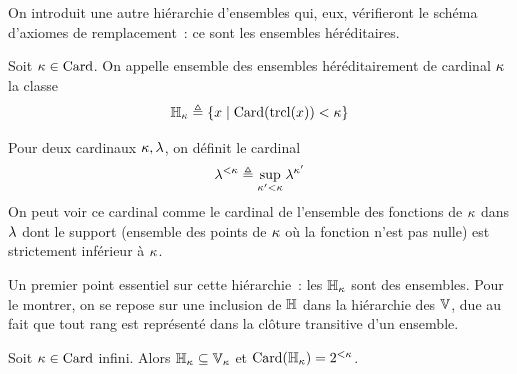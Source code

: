 On introduit une autre hiérarchie d'ensembles qui, eux, vérifieront le schéma
d'axiomes de remplacement~: ce sont les ensembles héréditaires.

\begin{definition}
  Soit $\kappa \in \operatorname{Card}$. On appelle ensemble des ensembles héréditairement de
  cardinal $\kappa$ la classe
  \[\mathbb H_\kappa \triangleq \left\{ x \;\middle\vert\; \operatorname{Card}(\operatorname{trcl}(x)) < \kappa \right\}\]
  \index[notation]{$\bH$}
\end{definition}

Pour deux cardinaux $\kappa,\lambda$, on définit le cardinal
\[\lambda^{<\kappa} \triangleq \sup_{\kappa' < \kappa} \lambda^{\kappa'}\]
On peut voir ce cardinal comme le cardinal de l'ensemble des fonctions de
$\kappa$ dans $\lambda$ dont le support (ensemble des points de $\kappa$ où la
fonction n'est pas nulle) est strictement inférieur à $\kappa$.

Un premier point essentiel sur cette hiérarchie~: les $\mathbb H_\kappa$ sont des
ensembles. Pour le montrer, on se repose sur une inclusion de $\bH$ dans la
hiérarchie des $\mathbb V$, due au fait que tout rang est représenté dans la clôture
transitive d'un ensemble.

\begin{proposition}\label{prop.Hcard}
  Soit $\kappa\in\operatorname{Card}$ infini. Alors $\mathbb H_\kappa\subseteq\mathbb V_\kappa$
  et $\operatorname{Card}(\mathbb H_\kappa) = 2^{<\kappa}$.
\end{proposition}

